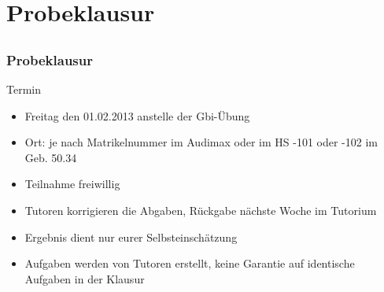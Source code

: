 \section{Probeklausur}
\subsection*{}
\begin{frame}
	\frametitle{Probeklausur}
	\begin{block}{Termin}
		\begin{itemize}
			\item Freitag den 01.02.2013 anstelle der Gbi-Übung
			\item Ort: je nach Matrikelnummer im Audimax oder im HS -101 oder -102 im Geb. 50.34
      \item Teilnahme freiwillig
      \item Tutoren korrigieren die Abgaben, Rückgabe nächste Woche im Tutorium
      \item Ergebnis dient nur eurer Selbsteinschätzung
      \item Aufgaben werden von Tutoren erstellt, keine Garantie auf identische Aufgaben in der Klausur
		\end{itemize}
  	\end{block}
\end{frame}
